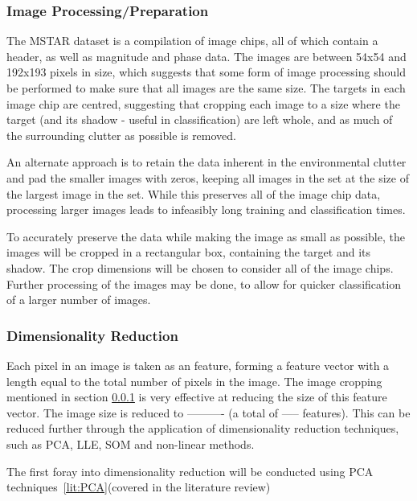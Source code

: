 \subsubsection{Image Processing/Preparation}\label{sec:cropping}
The MSTAR dataset is a compilation of image chips, all of which contain a header, as well as magnitude and phase data. The images are between 54x54 and 192x193 pixels in size, which suggests that some form of image processing should be performed to make sure that all images are the same size. The targets in each image chip are centred, suggesting that cropping each image to a size where the target (and its shadow - useful in classification) are left whole, and as much of the surrounding clutter as possible is removed.

An alternate approach is to retain the data inherent in the environmental clutter and pad the smaller images with zeros, keeping all images in the set at the size of the largest image in the set. While this preserves all of the image chip data, processing larger images leads to infeasibly long training and classification times.

To accurately preserve the data while making the image as small as possible, the images will be cropped in a rectangular box, containing the target and its shadow. The crop dimensions will be chosen to consider all of the image chips. Further processing of the images may be done, to allow for quicker classification of a larger number of images.

\subsubsection{Dimensionality Reduction}
Each pixel in an image is taken as an feature, forming a feature vector with a length equal to the total number of pixels in the image. The image cropping mentioned in section \ref{sec:cropping} is very effective at reducing the size of this feature vector. The image size is reduced to ---------- (a total of ----- features). This can be reduced further through the application of dimensionality reduction techniques, such as PCA, LLE, SOM and non-linear methods. 

The first foray into dimensionality reduction will be conducted using PCA techniques~\ref{lit:PCA}(covered in the literature review)

